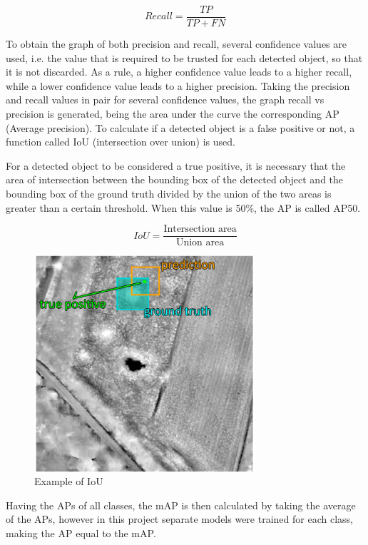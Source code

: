 \begin{equation}
     Recall = \frac{TP }{TP + FN}
\end{equation}

To obtain the graph of both precision and recall, several confidence values are used, i.e. the value that is required to be trusted for each detected object, so that it is not discarded. As a rule, a higher confidence value leads to a higher recall, while a lower confidence value leads to a higher precision. Taking the precision and recall values in pair for several confidence values, the graph recall vs precision is generated, being the area under the curve the corresponding AP (Average precision). To calculate if a detected object is a false positive or not, a function called IoU (intersection over union) is used.

For a detected object to be considered a true positive, it is necessary that the area of intersection between the bounding box of the detected object and the bounding box of the ground truth divided by the union of the two areas is greater than a certain threshold. When this value is 50\%, the AP is called AP50.

\begin{equation}
     IoU = \frac{\text{Intersection area}}{\text{Union area}}
\end{equation}

\begin{figure}[H]
\centering
\includegraphics[height=8cm]{images/IOU.png}
\caption{Example of IoU \cite{IOUpaper}}
\end{figure}

Having the APs of all classes, the mAP is then calculated by taking the average of the APs, however in this project separate models were trained for each class, making the AP equal to the mAP.

